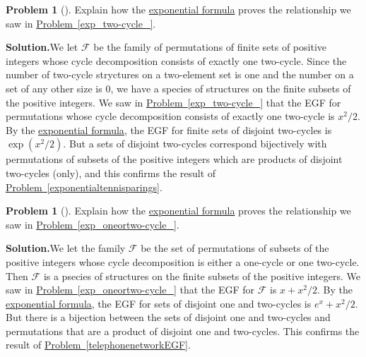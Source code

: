 \documentclass[10pt,]{book}
\theoremstyle{plain}
\theoremstyle{definition}
\newtheorem{activity}[project]{Problem}
\theoremstyle{definition}
\numberwithin{equation}{chapter}
\newcommand{\F}{\mathcal{F}}
\begin{document}
\begin{activity}[]\label{activity-415}
Explain how the \hyperref[exponentialformulathm]{exponential formula} proves the relationship we saw in \hyperref[exp_two-cycle_]{Problem~\ref{exp_two-cycle_}}.%
\par\medskip\noindent%
\textbf{Solution.}\quad We let \(\F\) be the family of permutations of finite sets of positive integers whose cycle decomposition consists of exactly one two-cycle. Since the number of two-cycle stryctures on a two-element set is one and the number on a set of any other size is 0, we have a species of structures on the finite subsets of the positive integers. We saw in \hyperref[exp_two-cycle_]{Problem~\ref{exp_two-cycle_}} that the EGF for permutations whose cycle decomposition consists of exactly one two-cycle is \(x^2/2\). By the \hyperref[exponentialformulathm]{exponential formula}, the EGF for finite sets of disjoint two-cycles is \(\exp(x^2/2)\). But a sets of disjoint two-cycles correspond bijectively with permutations of subsets of the positive integers which are products of disjoint two-cycles (only), and this confirms the result of \hyperref[exponentialtennisparings]{Problem~\ref{exponentialtennisparings}}.%
\end{activity}
\begin{activity}[]\label{activity-416}
Explain how the \hyperref[exponentialformulathm]{exponential formula} proves the relationship we saw in \hyperref[exp_oneortwo-cycle_]{Problem~\ref{exp_oneortwo-cycle_}}.%
\par\medskip\noindent%
\textbf{Solution.}\quad We let the family \(\F\) be the set of permutations of subsets of the positive integers whose cycle decomposition is either a one-cycle or one two-cycle. Then \(\F\) is a psecies of structures on the finite subsets of the positive integers. We saw in \hyperref[exp_oneortwo-cycle_]{Problem~\ref{exp_oneortwo-cycle_}} that the EGF for \(\F\) is \(x+x^2/2\). By the \hyperref[exponentialformulathm]{exponential formula}, the EGF for sets of disjoint one and two-cycles is \(e^x+x^2/2\). But there is a bijection between the sets of disjoint one and two-cycles and permutations that are a product of disjoint one and two-cycles. This confirms the result of \hyperref[telephonenetworkEGF]{Problem~\ref{telephonenetworkEGF}}.%
\end{activity}
\end{document}
